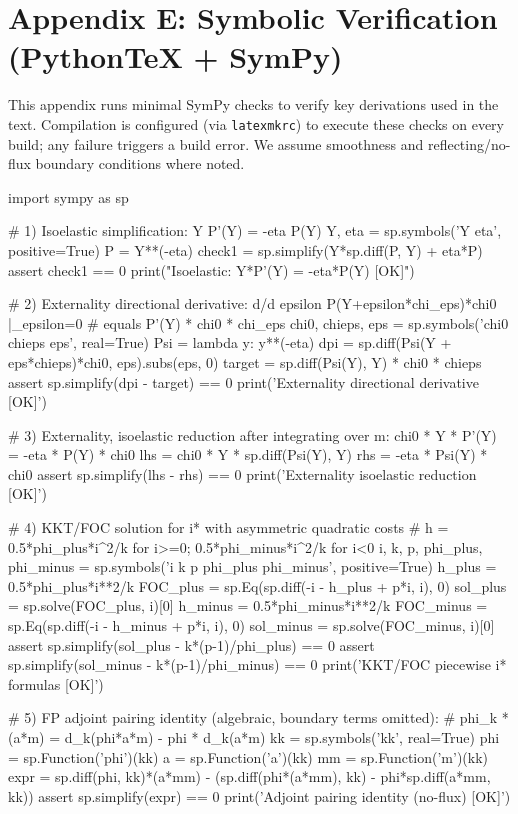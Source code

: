 \documentclass[11pt,letterpaper,oneside]{article}
\numberwithin{equation}{section}
\newcommand{\1}{\mathbf{1}}
\begin{document}
\section{Appendix E: Symbolic Verification (PythonTeX + SymPy)}\label{app:verification}

\noindent This appendix runs minimal SymPy checks to verify key derivations used in the text. Compilation is configured (via \texttt{latexmkrc}) to execute these checks on every build; any failure triggers a build error. We assume smoothness and reflecting/no-flux boundary conditions where noted.

\begin{pyconsole}
import sympy as sp

# 1) Isoelastic simplification:  Y P'(Y) = -eta P(Y)
Y, eta = sp.symbols('Y eta', positive=True)
P = Y**(-eta)
check1 = sp.simplify(Y*sp.diff(P, Y) + eta*P)
assert check1 == 0
print("Isoelastic: Y*P'(Y) = -eta*P(Y)  [OK]")

# 2) Externality directional derivative:  d/d epsilon P(Y+epsilon*chi_eps)*chi0 |_{epsilon=0}
#     equals P'(Y) * chi0 * chi_eps
chi0, chieps, eps = sp.symbols('chi0 chieps eps', real=True)
Psi = lambda y: y**(-eta)
dpi = sp.diff(Psi(Y + eps*chieps)*chi0, eps).subs(eps, 0)
target = sp.diff(Psi(Y), Y) * chi0 * chieps
assert sp.simplify(dpi - target) == 0
print('Externality directional derivative  [OK]')

# 3) Externality, isoelastic reduction after integrating over m:  chi0 * Y * P'(Y) = -eta * P(Y) * chi0
lhs = chi0 * Y * sp.diff(Psi(Y), Y)
rhs = -eta * Psi(Y) * chi0
assert sp.simplify(lhs - rhs) == 0
print('Externality isoelastic reduction   [OK]')

# 4) KKT/FOC solution for i* with asymmetric quadratic costs
#    h = 0.5*phi_plus*i^2/k for i>=0;   0.5*phi_minus*i^2/k for i<0
i, k, p, phi_plus, phi_minus = sp.symbols('i k p phi_plus phi_minus', positive=True)
h_plus  = 0.5*phi_plus*i**2/k
FOC_plus  = sp.Eq(sp.diff(-i - h_plus + p*i, i), 0)
sol_plus  = sp.solve(FOC_plus, i)[0]
h_minus = 0.5*phi_minus*i**2/k
FOC_minus = sp.Eq(sp.diff(-i - h_minus + p*i, i), 0)
sol_minus = sp.solve(FOC_minus, i)[0]
assert sp.simplify(sol_plus  - k*(p-1)/phi_plus)  == 0
assert sp.simplify(sol_minus - k*(p-1)/phi_minus) == 0
print('KKT/FOC piecewise i* formulas     [OK]')

# 5) FP adjoint pairing identity (algebraic, boundary terms omitted):
#    phi_k * (a*m) = d_k(phi*a*m) - phi * d_k(a*m)
kk = sp.symbols('kk', real=True)
phi = sp.Function('phi')(kk)
a   = sp.Function('a')(kk)
mm  = sp.Function('m')(kk)
expr = sp.diff(phi, kk)*(a*mm) - (sp.diff(phi*(a*mm), kk) - phi*sp.diff(a*mm, kk))
assert sp.simplify(expr) == 0
print('Adjoint pairing identity (no-flux) [OK]')


\end{pyconsole}
\end{document}
